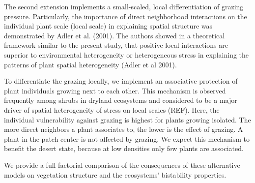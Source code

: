 
The second extension implements a small-scaled, local differentiation of grazing pressure. %
Particularly, the importance of direct neighborhood interactions on the individual plant scale (local scale) in explaining spatial structure was demonstrated by Adler et al. (2001). The authors showed in a theoretical framework similar to the present study, that positive local interactions are superior to environmental heterogeneity or heterogeneous stress in explaining the patterns of plant spatial heterogeneity (Adler et al 2001). 

To differentiate the grazing locally, we implement an associative protection of plant individuals growing next to each other. This mechanism is observed frequently among shrubs in dryland ecosystems and considered to be a major driver of spatial heterogeneity of stress on local scales (REF). 
Here, the individual vulnerability against grazing is highest for plants growing isolated. The more direct neighbors a plant associates to, the lower is the effect of grazing. A plant in the patch center is not affected by grazing. We expect this mechanism to benefit the desert state, because at low densities only few plants are associated.


 We provide a full factorial comparison of the consequences of these alternative models on vegetation structure and the ecosystems' bistability properties.


